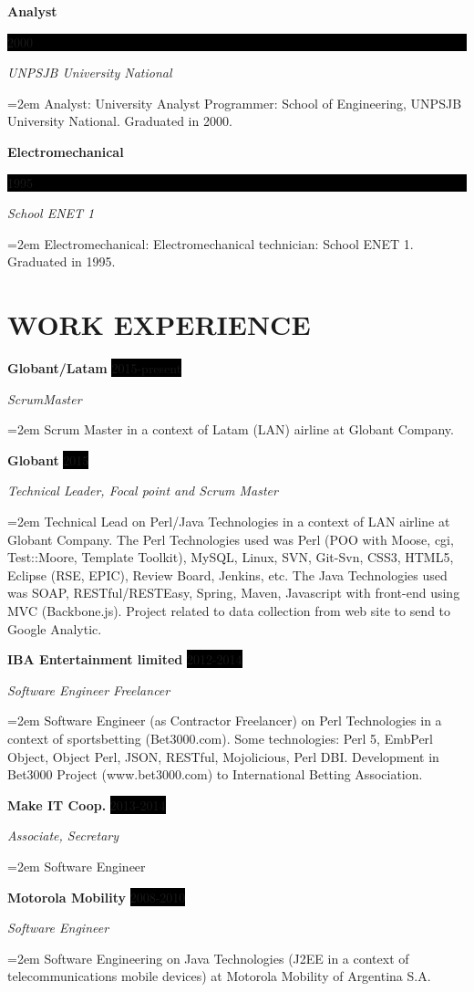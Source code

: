 \documentclass[paper=a4,fontsize=11pt]{scrartcl} %
\newcommand{\sepspace}{\vspace*{1em}}		%
\newcommand{\NewPart}[1]{\section*{\uppercase{#1}}}
\newcommand{\EducationEntry}[4]{ %
		\noindent \textbf{#1} \hfill      %
		\colorbox{Black}{%
			\parbox{6em}{%
			\hfill\color{White}#2}} \par  %
		\noindent \textit{#3} \par        %
		\noindent\hangindent=2em\hangafter=0 \small #4 %
		\normalsize \par}
\newcommand{\WorkEntry}[4]{				  %
		\noindent \textbf{#1} \hfill      %
		\colorbox{Black}{\color{White}#2} \par  %
		\noindent \textit{#3} \par              %
		\noindent\hangindent=2em\hangafter=0 \small #4 %
		\normalsize \par}
\begin{document}
\EducationEntry{Analyst}{2000}{UNPSJB University National}{Analyst: University Analyst Programmer: School of Engineering, UNPSJB University National. Graduated in 2000.}
\sepspace

\EducationEntry{Electromechanical}{1995}{School ENET 1}{Electromechanical: Electromechanical technician: School ENET 1. Graduated in 1995.}
\sepspace

\NewPart{Work experience}{}

\WorkEntry{Globant/Latam}{2015-present}{ScrumMaster}
{Scrum Master in a context of Latam (LAN) airline at Globant Company.}
\sepspace

\WorkEntry{Globant}{2015}{Technical Leader, Focal point and Scrum Master}
{Technical Lead on Perl/Java Technologies in a context of LAN airline at Globant Company. The Perl Technologies used was Perl (POO with Moose, cgi, Test::Moore, Template Toolkit), MySQL, Linux, SVN, Git-Svn, CSS3, HTML5, Eclipse (RSE, EPIC), Review Board, Jenkins, etc. The Java Technologies used was SOAP, RESTful/RESTEasy, Spring, Maven, Javascript with front-end using MVC (Backbone.js). Project related to data collection from web site to send to Google Analytic.}
\sepspace

\WorkEntry{IBA Entertainment limited}{2012-2014}{Software Engineer Freelancer}
{Software Engineer (as Contractor Freelancer) on Perl Technologies in a context of sportsbetting (Bet3000.com). Some technologies: Perl 5, EmbPerl Object, Object Perl, JSON, RESTful, Mojolicious, Perl DBI. Development in Bet3000 Project (www.bet3000.com) to International Betting Association.}
\sepspace

\WorkEntry{Make IT Coop.}{2013-2014}{Associate, Secretary}{
Software Engineer}
\sepspace

\WorkEntry{Motorola Mobility}{2008-2010}{Software Engineer}
{Software Engineering on Java Technologies (J2EE in a context of telecommunications mobile devices) at Motorola Mobility of Argentina S.A.}
\sepspace
\end{document}
